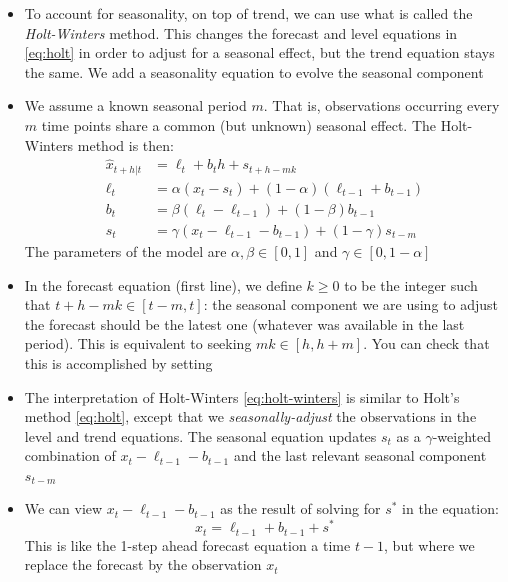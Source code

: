 \documentclass{article}
\begin{document}
\begin{itemize}
\item To account for seasonality, on top of trend, we can use what is called the   
  \emph{Holt-Winters} method. This changes the forecast and level equations in
  \eqref{eq:holt} in order to adjust for a seasonal effect, but the trend
  equation stays the same. We add a seasonality equation to evolve the seasonal
  component    

\item We assume a known seasonal period $m$. That is, observations occurring
  every $m$ time points share a common (but unknown) seasonal effect. The
  Holt-Winters method is then:  
  \begin{equation}
  \label{eq:holt-winters}
  \begin{aligned}
  \hat{x}_{t+h | t} &= \ell_t + b_t h + s_{t+h-mk} \\  
  \ell_t &= \alpha (x_t - s_t) + (1-\alpha) (\ell_{t-1} + b_{t-1}) \\ 
  b_t &= \beta (\ell_t - \ell_{t-1}) + (1-\beta) b_{t-1} \\
  s_t &= \gamma (x_t - \ell_{t-1} - b_{t-1}) + (1-\gamma) s_{t-m} 
  \end{aligned}
  \end{equation}
  The parameters of the model are $\alpha, \beta \in [0,1]$ and $\gamma \in [0,
  1-\alpha]$ 

\item In the forecast equation (first line), we define $k \geq 0$ to be the
  integer such that $t+h-mk \in [t-m, t]$: the seasonal component we are using
  to adjust the forecast should be the latest one (whatever was available in the
  last period). This is equivalent to seeking $mk \in [h, h+m]$. You can check
  that this is accomplished by setting  

\item The interpretation of Holt-Winters \eqref{eq:holt-winters} is similar to 
  Holt's method \eqref{eq:holt}, except that we \emph{seasonally-adjust} the 
  observations in the level and trend equations. The seasonal equation updates
  $s_t$ as a $\gamma$-weighted combination of $x_t - \ell_{t-1} -  b_{t-1}$ and
  the last relevant seasonal component $s_{t-m}$ 

\item We can view $x_t - \ell_{t-1} -  b_{t-1}$ as the result of solving for $s^*$
  in the equation:    
  \[
  x_t = \ell_{t-1} + b_{t-1} + s^*
  \]
  This is like the 1-step ahead forecast equation a time $t-1$, but where we
  replace the forecast  by the observation $x_t$ 


\end{itemize}
\end{document}
